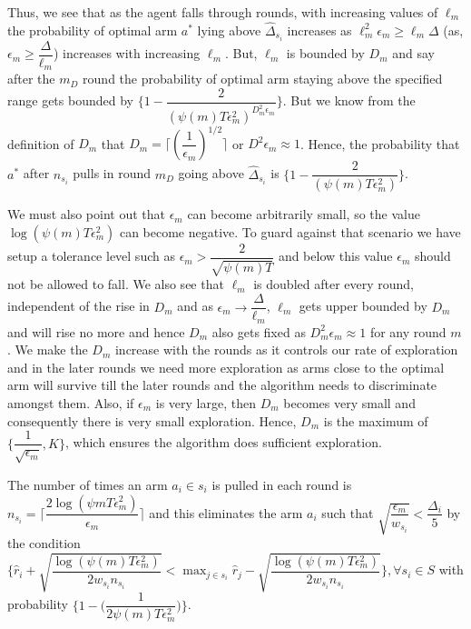 \begin{remark}
	Thus, we see that as the agent falls through rounds, with increasing values of $\ell_{m}$ the probability of optimal arm $a^{*}$ lying above $\hat{\Delta}_{s_{i}}$ increases as $\ell_{m}^{2}\epsilon_{m}\geq\ell_{m}\Delta$ (as, $\epsilon_{m}\geq \dfrac{\Delta}{\ell_{m}}$) increases with increasing $\ell_{m}$. But, $\ell_{m}$ is bounded by $D_{m}$ and say after the $m_{D}$ round the probability of optimal arm staying above the specified range gets bounded by $\bigg\lbrace 1- \dfrac{2}{(\psi(m)T\epsilon_{m}^{2})^{D_{m}^{2}\epsilon_{m}}} \bigg\rbrace$. But we know from the definition of $D_{m}$ that $ D_{m}=\bigg\lceil(\dfrac{1}{\epsilon_{m}})^{1/2}\bigg\rceil$ or $D^{2}\epsilon_{m}\approx 1$. Hence, the probability that   $a^{*}$ after $n_{s_{i}}$ pulls in round $m_{D}$ going above $\hat{\Delta}_{s_{i}}$ is $\bigg\lbrace 1- \dfrac{2}{(\psi(m)T\epsilon_{m}^{2}) }\bigg\rbrace$.

	We must also point out that $\epsilon_{m}$ can become arbitrarily small, so the value $\log{(\psi{(m)}T\epsilon_{m}^{2})}$ can become negative. To guard against that scenario we have setup a tolerance level such as $\epsilon_{m}>\dfrac{2}{\sqrt{\psi{(m)}T}}$ and below this value $\epsilon_{m}$ should not be allowed to fall. We also see that $\ell_{m}$ is doubled after every round, independent of the rise in $D_{m}$ and as $\epsilon_{m}\rightarrow \dfrac{\Delta}{\ell_{m}}$, $\ell_{m}$ gets upper bounded by $D_{m}$ and will rise no more and hence $D_{m}$ also gets fixed as $D_{m}^{2}\epsilon_{m}\approx 1$ for any round $m$. We make the $D_{m}$ increase with the rounds as it controls our rate of exploration and in the later rounds we need more exploration as arms close to the optimal arm will survive till the later rounds and the algorithm needs to discriminate amongst them.  Also, if $\epsilon_{m}$ is very large, then $D_{m}$ becomes very small and consequently there is very small exploration. Hence, $D_{m}$ 
is the maximum of $\lbrace \dfrac{1}{\sqrt{\epsilon_{m}}}, K \rbrace$, which ensures the algorithm does sufficient exploration. 
\end{remark}


\begin{proposition}
The number of times an arm $a_{i}\in s_{i}$ is pulled in each round is $n_{s_{i}}=\bigg\lceil\dfrac{2\log{(\psi{m}T\epsilon_{m}^{2})}}{\epsilon_{m}}\bigg\rceil$ and this eliminates the arm $a_{i}$ such that $\sqrt{\dfrac{\epsilon_{m}}{w_{s_{i}}}}<\dfrac{\Delta_{i}}{5}$ by the condition $\bigg\lbrace\hat{r}_{i} + \sqrt{\dfrac{\log (\psi(m)T\epsilon_{m}^{2})}{2w_{s_{i}} n_{s_{i}}}} < \max_{j\in s_{i}}\hat{r}_{j} - \sqrt{\dfrac{\log (\psi(m)T\epsilon_{m}^{2})}{2w_{s_{i}} n_{s_{i}}}} \bigg\rbrace, \forall s_{i}\in S$ with probability $\bigg\lbrace 1-\bigg(\dfrac{1}{2\psi(m)T\epsilon_{m}^{2}}\bigg)\bigg\rbrace$. 
\end{proposition}

